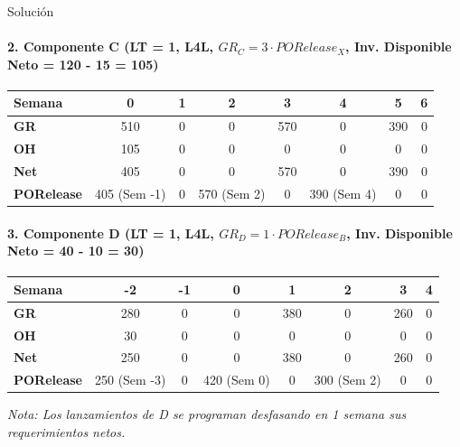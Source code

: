 \documentclass[11pt, a4paper]{article}
\begin{document}
\begin{ejercicio}{Solución}
  \paragraph{2. Componente C (LT = 1, L4L, $GR_C = 3 \cdot PORelease_X$, Inv. Disponible Neto = 120 - 15 = 105)}
  \begin{center}
  \small
  \begin{tabular}{lccccccc}
    \toprule
    \textbf{Semana} & \textbf{0} & \textbf{1} & \textbf{2} & \textbf{3} & \textbf{4} & \textbf{5} & \textbf{6} \\
    \midrule
    \textbf{GR} & 510 & 0 & 0 & 570 & 0 & 390 & 0 \\
    \textbf{OH} & 105 & 0 & 0 & 0 & 0 & 0 & 0 \\
    \textbf{Net} & 405 & 0 & 0 & 570 & 0 & 390 & 0 \\
    \textbf{PORelease} & 405 (Sem -1) & 0 & 570 (Sem 2) & 0 & 390 (Sem 4) & 0 & 0 \\
    \bottomrule
  \end{tabular}
  \end{center}

  \paragraph{3. Componente D (LT = 1, L4L, $GR_D = 1 \cdot PORelease_B$, Inv. Disponible Neto = 40 - 10 = 30)}
  \begin{center}
  \small
  \begin{tabular}{lccccccc}
    \toprule
    \textbf{Semana} & \textbf{-2} & \textbf{-1} & \textbf{0} & \textbf{1} & \textbf{2} & \textbf{3} & \textbf{4} \\
    \midrule
    \textbf{GR} & 280 & 0 & 0 & 380 & 0 & 260 & 0 \\
    \textbf{OH} & 30 & 0 & 0 & 0 & 0 & 0 & 0 \\
    \textbf{Net} & 250 & 0 & 0 & 380 & 0 & 260 & 0 \\
    \textbf{PORelease} & 250 (Sem -3) & 0 & 420 (Sem 0) & 0 & 300 (Sem 2) & 0 & 0 \\
    \bottomrule
  \end{tabular}
  \end{center}
  \textit{Nota: Los lanzamientos de D se programan desfasando en 1 semana sus requerimientos netos.}

\end{ejercicio}
\end{document}
